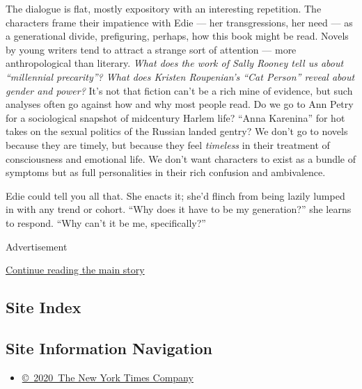 The dialogue is flat, mostly expository with an interesting repetition.
The characters frame their impatience with Edie --- her transgressions,
her need --- as a generational divide, prefiguring, perhaps, how this
book might be read. Novels by young writers tend to attract a strange
sort of attention --- more anthropological than literary. \emph{What
does the work of Sally Rooney tell us about ``millennial precarity''?
What does Kristen Roupenian's ``Cat Person'' reveal about gender and
power?} It's not that fiction can't be a rich mine of evidence, but such
analyses often go against how and why most people read. Do we go to Ann
Petry for a sociological snapshot of midcentury Harlem life? ``Anna
Karenina'' for hot takes on the sexual politics of the Russian landed
gentry? We don't go to novels because they are timely, but because they
feel \emph{timeless} in their treatment of consciousness and emotional
life. We don't want characters to exist as a bundle of symptoms but as
full personalities in their rich confusion and ambivalence.

Edie could tell you all that. She enacts it; she'd flinch from being
lazily lumped in with any trend or cohort. ``Why does it have to be my
generation?'' she learns to respond. ``Why can't it be me,
specifically?''

Advertisement

\protect\hyperlink{after-bottom}{Continue reading the main story}

\hypertarget{site-index}{%
\subsection{Site Index}\label{site-index}}

\hypertarget{site-information-navigation}{%
\subsection{Site Information
Navigation}\label{site-information-navigation}}

\begin{itemize}
\tightlist
\item
  \href{https://help.nytimes3xbfgragh.onion/hc/en-us/articles/115014792127-Copyright-notice}{©~2020~The
  New York Times Company}
\end{itemize}

